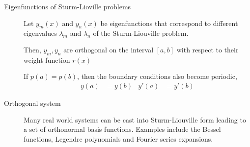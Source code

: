 \begin{description}
    \item[Eigenfunctions of Sturm-Lioville problems] Let $ y_m(x) $ and $ y_n(x) $ be
        eigenfunctions that correspond to different eigenvalues $ \lambda_m $ and
        $ \lambda_n $ of the Sturm-Liouville problem. \par
        Then, $ y_m, y_n $ are orthogonal on the interval $ [a, b] $ with respect to
        their weight function $ r(x) $ \par
        If $ p(a) = p(b) $, then the boundary conditions also become periodic,
        \begin{align}
            y(a) & = y(b) & y'(a) & = y'(b)
        \end{align}

    \item[Orthogonal system] Many real world systems can be cast into Sturm-Liouville
        form leading to a set of orthonormal basis functions. Examples include the Bessel
        functions, Legendre polynomials and Fourier series expansions.


\end{description}